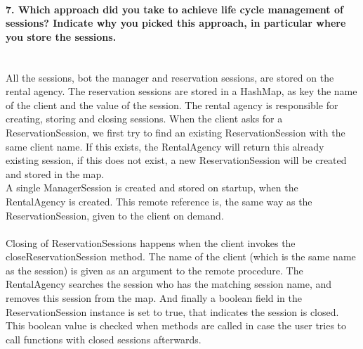 \documentclass{ds-report}
\begin{document}
	\paragraph{7. Which approach did you take to achieve life cycle management of sessions? Indicate why you picked this approach, in particular where you store the sessions.} \mbox{}\\
All the sessions, bot the manager and reservation sessions, are stored on the rental agency. The reservation sessions are stored in a HashMap, as key the name of the client and the value of the session. The rental agency is responsible for creating, storing and closing sessions. When the client asks for a ReservationSession, we first try to find an existing ReservationSession with the same client name. If this exists, the RentalAgency will return this already existing session, if this does not exist, a new ReservationSession will be created and stored in the map.\\
A single ManagerSession is created and stored on startup, when the RentalAgency is created. This remote reference is, the same way as the ReservationSession, given to the client on demand.\\
\mbox{}\\
Closing of ReservationSessions happens when the client invokes the closeReservationSession method. The name of the client (which is the same name as the session) is given as an argument to the remote procedure. The RentalAgency searches the session who has the matching session name, and removes this session from the map. And finally a boolean field in the ReservationSession instance is set to true, that indicates the session is closed. This boolean value is checked when methods are called in case the user tries to call functions with closed sessions afterwards.
\end{document}
